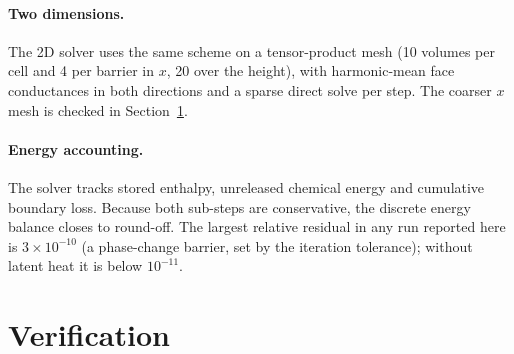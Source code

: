 \documentclass[11pt]{article}
\begin{document}
\paragraph{Two dimensions.} The 2D solver uses the same scheme on a tensor-product mesh
(10 volumes per cell and 4 per barrier in $x$, 20 over the height), with harmonic-mean
face conductances in both directions and a sparse direct solve per step. The coarser $x$
mesh is checked in Section~\ref{sec:verification}.

\paragraph{Energy accounting.} The solver tracks stored enthalpy, unreleased chemical
energy and cumulative boundary loss. Because both sub-steps are conservative, the
discrete energy balance closes to round-off. The largest relative residual in any run
reported here is $3\times10^{-10}$ (a phase-change barrier, set by the iteration
tolerance); without latent heat it is below $10^{-11}$.

\section{Verification}
\label{sec:verification}
\end{document}
